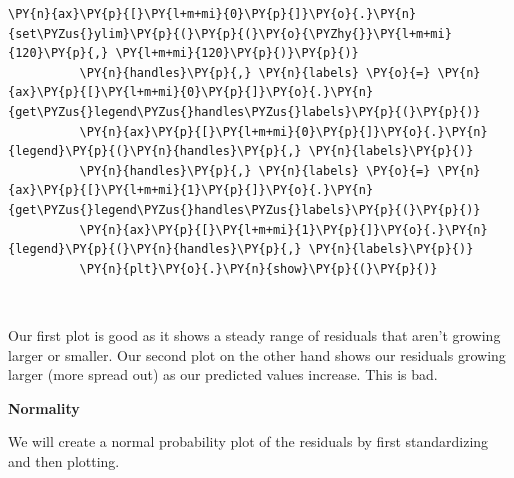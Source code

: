 \documentclass[10pt]{article}\usepackage[]{graphicx}\usepackage[]{xcolor}
\begin{document}
\begin{Verbatim}[commandchars=\\\{\}]
          \PY{n}{ax}\PY{p}{[}\PY{l+m+mi}{0}\PY{p}{]}\PY{o}{.}\PY{n}{set\PYZus{}ylim}\PY{p}{(}\PY{p}{(}\PY{o}{\PYZhy{}}\PY{l+m+mi}{120}\PY{p}{,} \PY{l+m+mi}{120}\PY{p}{)}\PY{p}{)}
          \PY{n}{handles}\PY{p}{,} \PY{n}{labels} \PY{o}{=} \PY{n}{ax}\PY{p}{[}\PY{l+m+mi}{0}\PY{p}{]}\PY{o}{.}\PY{n}{get\PYZus{}legend\PYZus{}handles\PYZus{}labels}\PY{p}{(}\PY{p}{)}
          \PY{n}{ax}\PY{p}{[}\PY{l+m+mi}{0}\PY{p}{]}\PY{o}{.}\PY{n}{legend}\PY{p}{(}\PY{n}{handles}\PY{p}{,} \PY{n}{labels}\PY{p}{)}
          \PY{n}{handles}\PY{p}{,} \PY{n}{labels} \PY{o}{=} \PY{n}{ax}\PY{p}{[}\PY{l+m+mi}{1}\PY{p}{]}\PY{o}{.}\PY{n}{get\PYZus{}legend\PYZus{}handles\PYZus{}labels}\PY{p}{(}\PY{p}{)}
          \PY{n}{ax}\PY{p}{[}\PY{l+m+mi}{1}\PY{p}{]}\PY{o}{.}\PY{n}{legend}\PY{p}{(}\PY{n}{handles}\PY{p}{,} \PY{n}{labels}\PY{p}{)}
          \PY{n}{plt}\PY{o}{.}\PY{n}{show}\PY{p}{(}\PY{p}{)}
\end{Verbatim}

    \begin{center}
    \end{center}
    { \hspace*{\fill} \\}
    
    Our first plot is good as it shows a steady range of residuals that
aren't growing larger or smaller. Our second plot on the other hand
shows our residuals growing larger (more spread out) as our predicted
values increase. This is bad.

\textbf{Normality}

We will create a normal probability plot of the residuals by first
standardizing and then plotting.
\end{document}
